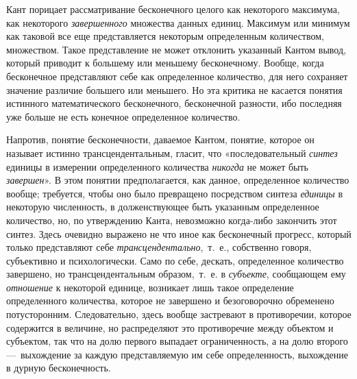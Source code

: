 {Кант порицает рассматривание бесконечного целого как некоторого максимума,
как некоторого {\em завершенного} множества данных
единиц. Максимум или минимум как таковой все еще представляется некоторым
определенным количеством, множеством. Такое представление не может
отклонить указанный Кантом вывод, который приводит к большему или меньшему
бесконечному. Вообще, когда бесконечное представляют себе как определенное
количество, для него сохраняет значение различие большего или меньшего. Но
эта критика не касается понятия истинного математического бесконечного,
бесконечной разности, ибо последняя уже больше не есть конечное
определенное количество.

Напротив, понятие бесконечности, даваемое Кантом, понятие, которое он
называет истинно трансцендентальным, гласит, что «последовательный
{\em синтез} единицы в измерении определенного
количества {\em никогда} не может быть
{\em завершен}». В этом понятии предполагается, как
данное, определенное количество вообще; требуется, чтобы оно было
превращено посредством синтеза {\em единицы} в
некоторую численность, в долженствующее быть указанным определенное
количество, но, по утверждению Канта, невозможно когда-либо закончить этот
синтез. Здесь очевидно выражено не что иное как бесконечный прогресс,
который только представляют себе
{\em трансцендентально},~т.~е., собственно говоря,
субъективно и психологически. Само по себе, дескать, определенное
количество завершено, но трансцендентальным образом,~т.~е. в
{\em субъекте}, сообщающем ему
{\em отношение} к некоторой единице, возникает лишь
такое определение определенного количества, которое не завершено и
безоговорочно обременено потусторонним. Следовательно, здесь вообще
застревают в противоречии, которое содержится в величине, но распределяют
это противоречие между объектом и субъектом, так что на долю первого
выпадает ограниченность, а на долю второго —~выхождение за каждую
представляемую им себе определенность, выхождение в дурную бесконечность.

}
